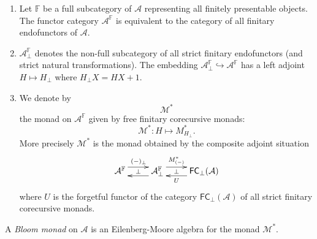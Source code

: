 \documentclass{LMCS}
\theoremstyle{plain}
\theoremstyle{definition}
\numberwithin{equation}{section}
\begin{document}
\begin{nota}\hfill
\begin{enumerate}[label=\({\alph*}]
\item Let $\mathbb F$ be a full subcategory of $\mathcal A$ representing all finitely presentable objects. The functor category $\mathcal A^{\mathbb F}$ is equivalent to the category of all finitary endofunctors of $\mathcal A$.

\item $\mathcal A_\bot^\mathbb F$ denotes the non-full subcategory of all strict finitary endofunctors (and strict natural transformations). The embedding $\mathcal A_\bot^\mathbb F\hookrightarrow\mathcal A^\mathbb F$ has a left adjoint $H\mapsto H_\bot$ where $H_\bot X=HX+1$.

\item We denote by $$\mathcal M^*$$ the monad on $\mathcal A^\mathbb F$ given by free finitary corecursive monads: $$\mathcal M^*:H\mapsto M^*_{H_\bot}.$$
More precisely $\mathcal M^*$ is the monad obtained by the composite adjoint situation
$$\xymatrix{
\mathcal{A}^\mathbb {F}
\ar@<5pt>[r]^{(-)_\bot}
\ar@{}[r]|-{\perp}
&
\mathcal{ A}^\mathbb{F}_\bot
\ar@<5pt>[l]
\ar@<5pt>[r]^-{M^*_{(-)}}
\ar@{}[r]|-\perp
&
\mathsf{FC}_{\bot}(\mathcal{ A})
\ar@<5pt>[l]^-U
}$$
where $U$ is the forgetful functor of the category
$\mathsf{FC}_{\bot}(\mathcal{ A})$ of all strict finitary corecursive
monads.
\end{enumerate}
\end{nota}

\begin{defi}
A \emph{Bloom monad} on $\mathcal A$ is an Eilenberg-Moore algebra for the monad $\mathcal M^*$.
\end{defi}
\end{document}
